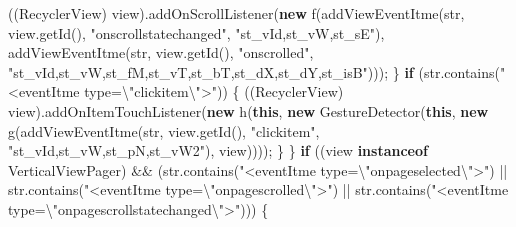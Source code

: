 \documentclass[
]{article}
\newenvironment{Shaded}{}{}
\newcommand{\ControlFlowTok}[1]{\textcolor[rgb]{0.00,0.44,0.13}{\textbf{#1}}}
\newcommand{\FunctionTok}[1]{\textcolor[rgb]{0.02,0.16,0.49}{#1}}
\newcommand{\KeywordTok}[1]{\textcolor[rgb]{0.00,0.44,0.13}{\textbf{#1}}}
\newcommand{\NormalTok}[1]{#1}
\newcommand{\OperatorTok}[1]{\textcolor[rgb]{0.40,0.40,0.40}{#1}}
\newcommand{\SpecialCharTok}[1]{\textcolor[rgb]{0.25,0.44,0.63}{#1}}
\newcommand{\StringTok}[1]{\textcolor[rgb]{0.25,0.44,0.63}{#1}}
\begin{document}
\begin{Shaded}
\begin{Highlighting}[]
                \OperatorTok{((}\NormalTok{RecyclerView}\OperatorTok{)}\NormalTok{ view}\OperatorTok{).}\FunctionTok{addOnScrollListener}\OperatorTok{(}\KeywordTok{new} \FunctionTok{f}\OperatorTok{(}\FunctionTok{addViewEventItme}\OperatorTok{(}\NormalTok{str}\OperatorTok{,}\NormalTok{ view}\OperatorTok{.}\FunctionTok{getId}\OperatorTok{(),} \StringTok{"onscrollstatechanged"}\OperatorTok{,} \StringTok{"st\_vId,st\_vW,st\_sE"}\OperatorTok{),} \FunctionTok{addViewEventItme}\OperatorTok{(}\NormalTok{str}\OperatorTok{,}\NormalTok{ view}\OperatorTok{.}\FunctionTok{getId}\OperatorTok{(),} \StringTok{"onscrolled"}\OperatorTok{,} \StringTok{"st\_vId,st\_vW,st\_fM,st\_vT,st\_bT,st\_dX,st\_dY,st\_isB"}\OperatorTok{)));}
            \OperatorTok{\}}
            \ControlFlowTok{if} \OperatorTok{(}\NormalTok{str}\OperatorTok{.}\FunctionTok{contains}\OperatorTok{(}\StringTok{"\textless{}eventItme type=}\SpecialCharTok{\textbackslash{}"}\StringTok{clickitem}\SpecialCharTok{\textbackslash{}"}\StringTok{\textgreater{}"}\OperatorTok{))} \OperatorTok{\{}
                \OperatorTok{((}\NormalTok{RecyclerView}\OperatorTok{)}\NormalTok{ view}\OperatorTok{).}\FunctionTok{addOnItemTouchListener}\OperatorTok{(}\KeywordTok{new} \FunctionTok{h}\OperatorTok{(}\KeywordTok{this}\OperatorTok{,} \KeywordTok{new} \FunctionTok{GestureDetector}\OperatorTok{(}\KeywordTok{this}\OperatorTok{,} \KeywordTok{new} \FunctionTok{g}\OperatorTok{(}\FunctionTok{addViewEventItme}\OperatorTok{(}\NormalTok{str}\OperatorTok{,}\NormalTok{ view}\OperatorTok{.}\FunctionTok{getId}\OperatorTok{(),} \StringTok{"clickitem"}\OperatorTok{,} \StringTok{"st\_vId,st\_vW,st\_pN,st\_vW2"}\OperatorTok{),}\NormalTok{ view}\OperatorTok{))));}
            \OperatorTok{\}}
        \OperatorTok{\}}
        \ControlFlowTok{if} \OperatorTok{((}\NormalTok{view }\KeywordTok{instanceof}\NormalTok{ VerticalViewPager}\OperatorTok{)} \OperatorTok{\&\&} \OperatorTok{(}\NormalTok{str}\OperatorTok{.}\FunctionTok{contains}\OperatorTok{(}\StringTok{"\textless{}eventItme type=}\SpecialCharTok{\textbackslash{}"}\StringTok{onpageselected}\SpecialCharTok{\textbackslash{}"}\StringTok{\textgreater{}"}\OperatorTok{)} \OperatorTok{||}\NormalTok{ str}\OperatorTok{.}\FunctionTok{contains}\OperatorTok{(}\StringTok{"\textless{}eventItme type=}\SpecialCharTok{\textbackslash{}"}\StringTok{onpagescrolled}\SpecialCharTok{\textbackslash{}"}\StringTok{\textgreater{}"}\OperatorTok{)} \OperatorTok{||}\NormalTok{ str}\OperatorTok{.}\FunctionTok{contains}\OperatorTok{(}\StringTok{"\textless{}eventItme type=}\SpecialCharTok{\textbackslash{}"}\StringTok{onpagescrollstatechanged}\SpecialCharTok{\textbackslash{}"}\StringTok{\textgreater{}"}\OperatorTok{)))} \OperatorTok{\{}

\end{Highlighting}
\end{Shaded}
\end{document}
